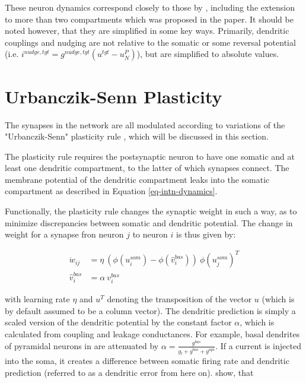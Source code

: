 These neuron dynamics correspond closely to those by \cite{urbanczik2014learning}, including the extension to more than
two compartments which was proposed in the paper. It should be noted however, that they are simplified in some key ways.
Primarily, dendritic couplings and nudging are not relative to the somatic or some reversal potential (i.e. $i^{nudge,
      tgt}= g^{nudge, tgt} (u^{tgt} - u_N^P )$), but are simplified to absolute values. 








\section{Urbanczik-Senn Plasticity}\label{sec-urb-senn-plast}

The synapses in the network are all modulated according to variations of the "Urbanczik-Senn" plasticity rule
\citep{urbanczik2014learning}, which will be discussed in this section. 

The plasticity rule requires the postsynaptic neuron to have one somatic and at least one dendritic compartment, to the
latter of which synapses connect. The membrane potential of the dendritic compartment leaks into the somatic compartment
as described in Equation \ref{eq-intn-dynamics}.


Functionally, the plasticity rule changes the synaptic weight in such a way, as to minimize discrepancies between
somatic and dendritic potential. The change in weight for a synapse fron neuron $j$ to neuron $i$ is thus given by:

\begin{align}
  \dot{w}_{ij}    & = \eta \ ( \phi(u_i^{som}) - \phi(\hat{v}_i^{bas}) ) \ \phi(u_j^{som})^T \\
  \hat{v}_i^{bas} & = \alpha \  v_i^{bas}
\end{align}

with learning rate $\eta$ and $u^T$ denoting the transposition of the vector $u$ (which is by default assumed to be a
column vector). The dendritic prediction is simply a scaled version of the dendritic potential by the constant factor
$\alpha$, which is calculated from coupling and leakage conductances. For example, basal dendrites of pyramidal neurons
in \cite{sacramento2018dendritic} are attenuated by $\alpha = \frac{g^{bas}}{g_l + g^{bas} + g^{api}}$. If a current is
injected into the soma, it creates a difference between somatic firing rate and dendritic prediction (referred to as a
dendritic error from here on). \cite{urbanczik2014learning} show, that 





